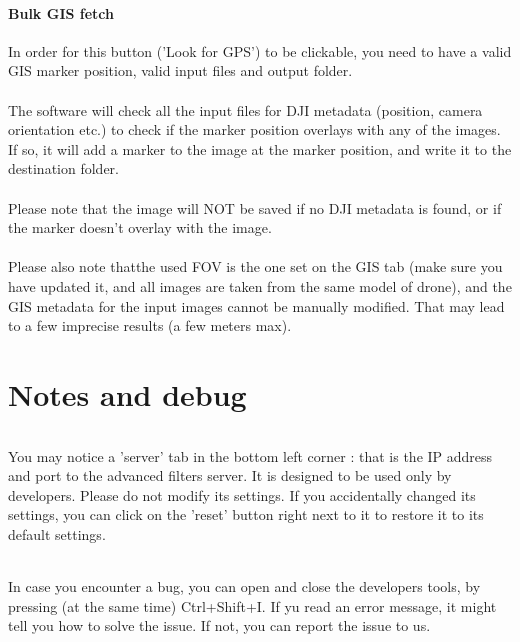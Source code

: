 \documentclass[12pt,a4paper]{article}
\begin{document}
\subsection{Bulk GIS fetch}
In order for this button ('Look for GPS') to be clickable, you need to have a valid GIS marker position, valid input files and output folder.\\
~\\
The software will check all the input files for DJI metadata (position, camera orientation etc.) to check if the marker position overlays with any of the images. If so, it will add a marker to the image at the marker position, and write it to the destination folder.\\
~\\
Please note that the image will NOT be saved if no DJI metadata is found, or if the marker doesn't overlay with the image.\\
~\\
Please also note thatthe used FOV is the one set on the GIS tab (make sure you have updated it, and all images are taken from the same model of drone), and the GIS metadata for the input images cannot be manually modified. That may lead to a few imprecise results (a few meters max).

\pagebreak

\part{Notes and debug}
\setcounter{section}{0}

\paragraph{} You may notice a 'server' tab in the bottom left corner : that is the IP address and port to the advanced filters server. It is designed to be used only by developers. Please do not modify its settings. If you accidentally changed its settings, you can click on the 'reset' button right next to it to restore it to its default settings.\\

\paragraph{} In case you encounter a bug, you can open and close the developers tools, by pressing (at the same time) Ctrl+Shift+I. If yu read an error message, it might tell you how to solve the issue. If not, you can report the issue to us.
\end{document}
